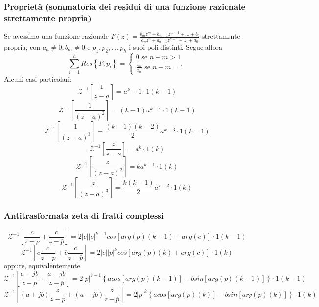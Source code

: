 \documentclass[11pt]{article}
\newcommand{\trz}{\mathcal{Z}}
\begin{document}
\subsubsection{Proprietà (sommatoria dei residui di una funzione razionale strettamente propria)}
Se avessimo una funzione razionale $F(z)=\frac{b_mz^m+b_{m-1}z^{m-1}+...+b_0}{a_nz^n+a_{n-1}z^{n-1}+\dots+a_0}$ strettamente propria, con $a_n\neq0, b_m\neq0$ e $p_1,p_2,\dots,p_h$ i suoi poli distinti. Segue allora
\begin{displaymath}
    \sum_{i=1}^h Res\left\{F,p_i\right\} = \begin{cases}
        0 \textrm{ se }n-m>1 \\
        \frac{b_m}{a_n} \textrm{ se }n-m=1
    \end{cases}
\end{displaymath}
Alcuni casi particolari:
\begin{displaymath}
    \trz^{-1}\left[\frac{1}{z-a}\right] = a^k-1 \cdot 1(k-1)
\end{displaymath}
\begin{displaymath}
    \trz^{-1}\left[\frac{1}{(z-a)^2}\right] = (k-1)a^{k-2}\cdot 1(k-1)
\end{displaymath}
\begin{displaymath}
    \trz^{-1}\left[\frac{1}{(z-a)^3}\right] = \frac{(k-1)(k-2)}{2}a^{k-3}\cdot 1(k-1)
\end{displaymath}
\begin{displaymath}
    \trz^{-1}\left[\frac{z}{z-a}\right] = a^k \cdot 1(k)
\end{displaymath}
\begin{displaymath}
    \trz^{-1}\left[\frac{z}{(z-a)^2}\right] = ka^{k-1}\cdot 1(k)
\end{displaymath}
\begin{displaymath}
    \trz^{-1}\left[\frac{z}{(z-a)^3}\right] = \frac{k(k-1)}{2}a^{k-2}\cdot 1(k)
\end{displaymath}
\subsubsection{Antitrasformata zeta di fratti complessi}
\begin{displaymath}
    \trz^{-1}\left[\frac{c}{z-p}+\frac{\overline{c}}{z-\overline{p}}\right] = 2|c||p|^{k-1} cos\left[arg(p)(k-1)+arg(c)\right]\cdot 1(k-1)
\end{displaymath}
\begin{displaymath}
    \trz^{-1}\left[c\frac{c}{z-p}+\overline{c}\frac{\overline{c}}{z-\overline{p}}\right] = 2|c||p|^{k} cos\left[arg(p)(k)+arg(c)\right]\cdot 1(k)
\end{displaymath}
oppure, equivalentemente
\begin{displaymath}
    \trz^{-1}\left[\frac{a+jb}{z-p}+\frac{a-jb}{z-\overline{p}}\right] = 2|p|^{k-1}\left\{a cos[arg(p)(k-1)]- b sin [arg(p)(k-1)]\right\} \cdot 1(k-1)
\end{displaymath}
\begin{displaymath}
    \trz^{-1}\left[(a+jb)\frac{z}{z-p}+(a-jb)\frac{z}{z-\overline{p}}\right] = 2|p|^{k}\left\{a cos[arg(p)(k)]- b sin [arg(p)(k)]\right\} \cdot 1(k)
\end{displaymath}
\end{document}
